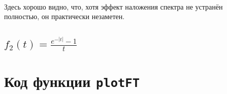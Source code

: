 \documentclass[11pt, oneside, final]{article}
\numberwithin{equation}{section}
\begin{document}
\begin{enumerate}
\begin{figure}[!h]
            \label{pic:f1:5}
        \end{figure} \\
        Здесь хорошо видно, что, хотя эффект наложения спектра не устранён полностью, он практически незаметен.
    \end{enumerate}
    \clearpage
    \subsection{\(f_2(t) = \frac{e^{-|t|} - 1}{t} \)} %
    \label{sub:f2}
    
    \appendix
    \section{Код функции \texttt{plotFT}} %
    \label{lst:code}
\end{document}
